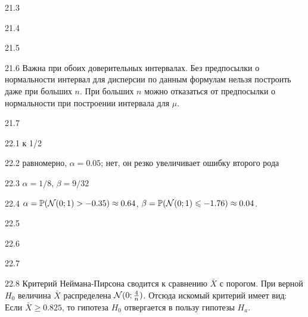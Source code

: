 \protect \hypertarget {soln:21.3}{}
\begin{solution}{{21.3}}
\end{solution}
\protect \hypertarget {soln:21.4}{}
\begin{solution}{{21.4}}
\end{solution}
\protect \hypertarget {soln:21.5}{}
\begin{solution}{{21.5}}
\end{solution}
\protect \hypertarget {soln:21.6}{}
\begin{solution}{{21.6}}
Важна при обоих доверительных интервалах. Без предпосылки о нормальности интервал для дисперсии по данным формулам нельзя построить даже при больших $n$. При больших $n$ можно отказаться от предпосылки о нормальности при построении интервала для $\mu$.
\end{solution}
\protect \hypertarget {soln:21.7}{}
\begin{solution}{{21.7}}
\end{solution}
\protect \hypertarget {soln:22.1}{}
\begin{solution}{{22.1}}
к 1/2
\end{solution}
\protect \hypertarget {soln:22.2}{}
\begin{solution}{{22.2}}
  равномерно, $\alpha=0.05$; нет, он резко увеличивает ошибку второго рода
\end{solution}
\protect \hypertarget {soln:22.3}{}
\begin{solution}{{22.3}}
  $\alpha = 1/8$, $\beta = 9/32$
\end{solution}
\protect \hypertarget {soln:22.4}{}
\begin{solution}{{22.4}}
  $\alpha = \mathbb{P}(\mathcal{N}(0;1) > -0.35) \approx 0.64$, $\beta = \mathbb{P}(\mathcal{N}(0;1) \leqslant -1.76) \approx 0.04$.
\end{solution}
\protect \hypertarget {soln:22.5}{}
\begin{solution}{{22.5}}
\end{solution}
\protect \hypertarget {soln:22.6}{}
\begin{solution}{{22.6}}
\end{solution}
\protect \hypertarget {soln:22.7}{}
\begin{solution}{{22.7}}

\end{solution}
\protect \hypertarget {soln:22.8}{}
\begin{solution}{{22.8}}
Критерий Неймана-Пирсона сводится к сравнению $\bar X$ с порогом. При верной $H_0$ величина $\bar X$ распределена $\mathcal{N}(0; \frac{4}{n})$.
Отсюда искомый критерий имеет вид:
Если $\bar X  \geqslant 0.825$, то гипотеза ${H_0}$ отвергается в пользу гипотезы ${H_a}$.
\end{solution}
